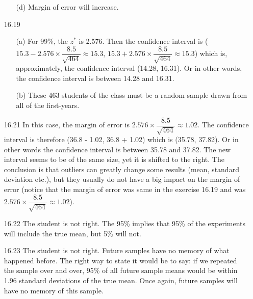\documentclass[11pt, a4paper]{article}
\begin{document}
\begin{itemize}
\begin{itemize}
\item[]

\item[(d)]
Margin of error will increase.
\end{itemize}

\item[]
\item[]

\item[16.19]
\begin{itemize}
\item[(a)]
For 99\%, the $z^*$ is 2.576. Then the confidence interval
is ($15.3 - 2.576 \times \dfrac{8.5}{\sqrt{464}} \approx 15.3$, $15.3 + 2.576 \times \dfrac{8.5}{\sqrt{464 }} \approx 15.3$)
which is, approximately, the confidence interval (14.28, 16.31). Or in other words,
the confidence interval is between 14.28 and 16.31.

\item[]

\item[(b)]
These 463 students of the class must be a random
sample drawn from all of the first-years.
\end{itemize}

\item[]
\item[]

\item[16.21]
In this case, the margin of error is $2.576 \times \dfrac{8.5}{\sqrt{464}} \approx 1.02$.
The confidence interval is therefore (36.8 - 1.02, 36.8 + 1.02) which is (35.78, 37.82).
Or in other words the confidence interval is between 35.78 and 37.82.
The new interval seems to be of the same size, yet it is shifted to the right.
The conclusion is that outliers can greatly change some results (mean, standard deviation etc.),
but they usually do not have a big impact on the margin of error (notice that the margin
of error was same in the exercise 16.19 and was $2.576 \times \dfrac{8.5}{\sqrt{464}} \approx 1.02$).

\item[]
\item[]

\item[16.22]
The student is not right. The 95\% implies that 95\% of the experiments
will include the true mean, but 5\% will not.

\item[]
\item[]

\item[16.23]
The student is not right. Future samples have no memory of what happened before.
The right way to state it would be to say: if we repeated the sample over and over,
95\% of all future sample means would be within 1.96 standard deviations of the true mean.
Once again, future samples will have no memory of this sample.
\end{itemize}
\end{document}
